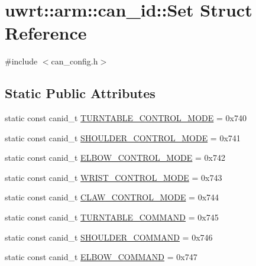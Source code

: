 \hypertarget{structuwrt_1_1arm_1_1can__id_1_1_set}{}\section{uwrt\+:\+:arm\+:\+:can\+\_\+id\+:\+:Set Struct Reference}
\label{structuwrt_1_1arm_1_1can__id_1_1_set}


{\ttfamily \#include $<$can\+\_\+config.\+h$>$}

\subsection*{Static Public Attributes}
\begin{DoxyCompactItemize}
\item 
static const canid\+\_\+t \hyperlink{structuwrt_1_1arm_1_1can__id_1_1_set_a003226a9e1602b02671aa2c7238d6e39}{T\+U\+R\+N\+T\+A\+B\+L\+E\+\_\+\+C\+O\+N\+T\+R\+O\+L\+\_\+\+M\+O\+DE} = 0x740
\item 
static const canid\+\_\+t \hyperlink{structuwrt_1_1arm_1_1can__id_1_1_set_aa9f008380317a3e374cedb991f2b7c0c}{S\+H\+O\+U\+L\+D\+E\+R\+\_\+\+C\+O\+N\+T\+R\+O\+L\+\_\+\+M\+O\+DE} = 0x741
\item 
static const canid\+\_\+t \hyperlink{structuwrt_1_1arm_1_1can__id_1_1_set_a7bdb4b8618186b0d9c616582384e7305}{E\+L\+B\+O\+W\+\_\+\+C\+O\+N\+T\+R\+O\+L\+\_\+\+M\+O\+DE} = 0x742
\item 
static const canid\+\_\+t \hyperlink{structuwrt_1_1arm_1_1can__id_1_1_set_a60df1e7ff2760a8b8cecc2ede18454e4}{W\+R\+I\+S\+T\+\_\+\+C\+O\+N\+T\+R\+O\+L\+\_\+\+M\+O\+DE} = 0x743
\item 
static const canid\+\_\+t \hyperlink{structuwrt_1_1arm_1_1can__id_1_1_set_aa8eb176701392e03f94bf851011a7c1d}{C\+L\+A\+W\+\_\+\+C\+O\+N\+T\+R\+O\+L\+\_\+\+M\+O\+DE} = 0x744
\item 
static const canid\+\_\+t \hyperlink{structuwrt_1_1arm_1_1can__id_1_1_set_ad0a6e521cd2d3d1b9845d1edf07d0461}{T\+U\+R\+N\+T\+A\+B\+L\+E\+\_\+\+C\+O\+M\+M\+A\+ND} = 0x745
\item 
static const canid\+\_\+t \hyperlink{structuwrt_1_1arm_1_1can__id_1_1_set_a33395d02979aedb2da0e2ea4436b2deb}{S\+H\+O\+U\+L\+D\+E\+R\+\_\+\+C\+O\+M\+M\+A\+ND} = 0x746
\item 
static const canid\+\_\+t \hyperlink{structuwrt_1_1arm_1_1can__id_1_1_set_a50d81398d123d4d37836639322a1d34c}{E\+L\+B\+O\+W\+\_\+\+C\+O\+M\+M\+A\+ND} = 0x747
\item 

\end{DoxyCompactItemize}
